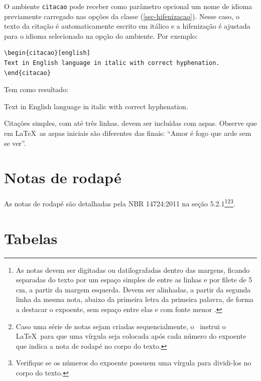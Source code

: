 O ambiente \texttt{citacao} pode receber como parâmetro opcional um nome de
idioma previamente carregado nas opções da classe (\autoref{sec-hifenizacao}). Nesse
caso, o texto da citação é automaticamente escrito em itálico e a hifenização é
ajustada para o idioma selecionado na opção do ambiente. Por exemplo:
\begin{verbatim}
\begin{citacao}[english]
Text in English language in italic with correct hyphenation.
\end{citacao}
\end{verbatim}

Tem como resultado:
\begin{citacao}[english]
Text in English language in italic with correct hyphenation.
\end{citacao}

Citações simples, com até três linhas, devem ser
incluídas com aspas. Observe que em \LaTeX\ as aspas iniciais são diferentes das
finais: ``Amor é fogo que arde sem se ver''.

\section{Notas de rodapé}

As notas de rodapé são detalhadas pela NBR 14724:2011 na seção 5.2.1\footnote{As
notas devem ser digitadas ou datilografadas dentro das margens, ficando
separadas do texto por um espaço simples de entre as linhas e por filete de 5
cm, a partir da margem esquerda. Devem ser alinhadas, a partir da segunda linha
da mesma nota, abaixo da primeira letra da primeira palavra, de forma a destacar
o expoente, sem espaço entre elas e com fonte menor
.}\footnote{Caso uma série de notas sejam
criadas sequencialmente, o \abnTeX\ instrui o \LaTeX\ para que uma vírgula seja
colocada após cada número do expoente que indica a nota de rodapé no corpo do
texto.}\footnote{Verifique se os números do expoente possuem uma vírgula para
dividi-los no corpo do texto.}. 


\section{Tabelas}

